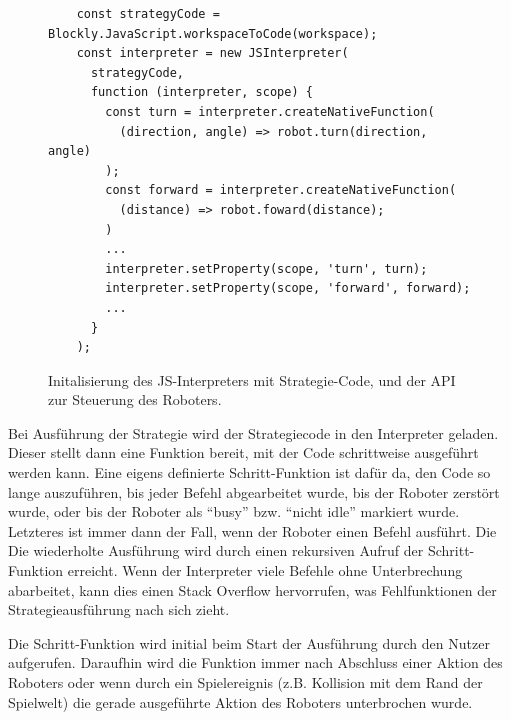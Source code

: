 \begin{figure}
  \caption{Initalisierung des JS-Interpreters mit Strategie-Code, und der API zur Steuerung des
  Roboters.}

  \label{js-interpreter-init}

  \begin{lstlisting}
    const strategyCode = Blockly.JavaScript.workspaceToCode(workspace);
    const interpreter = new JSInterpreter(
      strategyCode,
      function (interpreter, scope) {
        const turn = interpreter.createNativeFunction(
          (direction, angle) => robot.turn(direction, angle)
        );
        const forward = interpreter.createNativeFunction(
          (distance) => robot.foward(distance);
        )
        ...
        interpreter.setProperty(scope, 'turn', turn);
        interpreter.setProperty(scope, 'forward', forward);
        ...
      }
    );
  \end{lstlisting}
\end{figure}

Bei Ausführung der Strategie wird der Strategiecode in den Interpreter geladen. Dieser stellt dann
eine Funktion bereit, mit der Code schrittweise ausgeführt werden kann. Eine eigens definierte
Schritt-Funktion ist dafür da, den Code so lange auszuführen, bis jeder Befehl abgearbeitet wurde,
bis der Roboter zerstört wurde, oder bis der Roboter als \enquote{busy} bzw. \enquote{nicht idle}
markiert wurde. Letzteres ist immer dann der Fall, wenn der Roboter einen Befehl ausführt. Die
Die wiederholte Ausführung wird durch einen rekursiven Aufruf der Schritt-Funktion erreicht. Wenn der
Interpreter viele Befehle ohne Unterbrechung abarbeitet, kann dies einen Stack Overflow hervorrufen,
was Fehlfunktionen der Strategieausführung nach sich zieht.

Die Schritt-Funktion wird initial beim Start der Ausführung durch den Nutzer aufgerufen. Daraufhin
wird die Funktion immer nach Abschluss einer Aktion des Roboters oder wenn durch ein Spielereignis
(z.B. Kollision mit dem Rand der Spielwelt) die gerade ausgeführte Aktion des Roboters unterbrochen
wurde.


